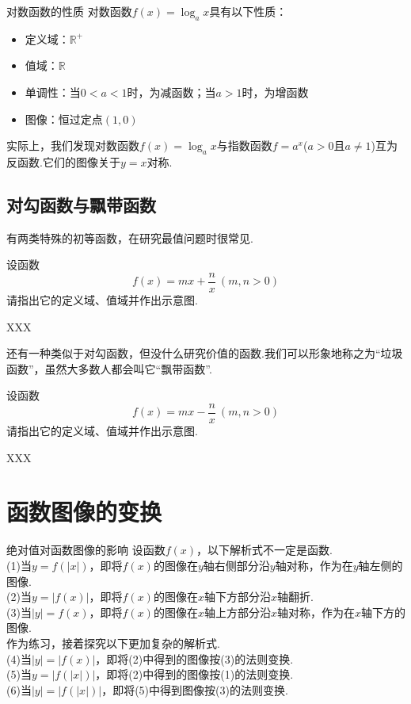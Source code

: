 \documentclass[lang=cn, zihao=5]{elegantbook}
\begin{document}
\begin{proposition}{对数函数的性质}
    对数函数$f(x)=\log_{a}{x}$具有以下性质：
    \begin{itemize}
        \item 定义域：$\mathbb{R}^{+}$
        \item 值域：$\mathbb{R}$
        \item 单调性：当$0<a<1$时，为减函数；当$a>1$时，为增函数
        \item 图像：恒过定点$(1,0)$
    \end{itemize}
\end{proposition}


实际上，我们发现对数函数$f(x)=\log_{a}{x}$与指数函数$f=a^{x}$($a>0$且$a \neq 1$)互为反函数.它们的图像关于$y=x$对称.

\subsection{对勾函数与飘带函数}

有两类特殊的初等函数，在研究最值问题时很常见.

\begin{problem}
    设函数$$f(x)=mx+\frac{n}{x}~(m,n>0)$$
    请指出它的定义域、值域并作出示意图.
\end{problem}
\begin{solution}
    XXX
\end{solution}

还有一种类似于对勾函数，但没什么研究价值的函数.我们可以形象地称之为“垃圾函数”，虽然大多数人都会叫它“飘带函数”.

\begin{problem}
    设函数$$f(x)=mx-\frac{n}{x}~(m,n>0)$$
    请指出它的定义域、值域并作出示意图.
\end{problem}
\begin{solution}
    XXX
\end{solution}

\section{函数图像的变换}

\begin{proposition}{绝对值对函数图像的影响}
    设函数$f(x)$，以下解析式不一定是函数.\\
    (1)当$y=f(|x|)$，即将$f(x)$的图像在$y$轴右侧部分沿$y$轴对称，作为在$y$轴左侧的图像.\\
    (2)当$y=|f(x)|$，即将$f(x)$的图像在$x$轴下方部分沿$x$轴翻折.\\
    (3)当$|y|=f(x)$，即将$f(x)$的图像在$x$轴上方部分沿$x$轴对称，作为在$x$轴下方的图像.\\
    作为练习，接着探究以下更加复杂的解析式.\\
    (4)当$|y|=|f(x)|$，即将(2)中得到的图像按(3)的法则变换.\\
    (5)当$y=|f(|x|)|$，即将(2)中得到的图像按(1)的法则变换.\\
    (6)当$|y|=|f(|x|)|$，即将(5)中得到图像按(3)的法则变换.
\end{proposition}
\end{document}
